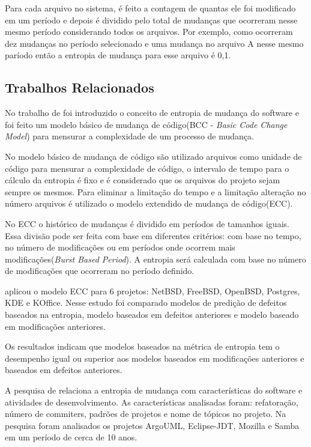 Para cada arquivo no sistema, é feito a contagem de quantas ele foi modificado em um período e depois é dividido pelo total de mudanças que ocorreram nesse mesmo período considerando todos os arquivos. Por exemplo, como ocorreram dez mudanças no período selecionado e uma mudança no arquivo A nesse mesmo paríodo então a entropia de mudança para esse arquivo é 0,1.

\subsection{Trabalhos Relacionados}
No trabalho de  foi introduzido o conceito de entropia de mudança do software e foi feito um modelo básico de mudança de código(BCC - \textit{Basic Code Change Model}) para mensurar a complexidade de um processo de mudança.

No modelo básico de mudança de código são utilizado arquivos como unidade de código para mensurar a complexidade de código, o intervalo de tempo para o cálculo da entropia é fixo e é considerado que os arquivos do projeto sejam sempre os mesmos. Para eliminar a limitação do tempo e a limitação alteração no número arquivos é utilizado o modelo extendido de mudança de código(ECC).

No ECC o histórico de mudanças é dividido em períodos de tamanhos iguais. Essa divisão pode ser feita com base em diferentes critérios: com base no tempo, no número de modificações ou em períodos onde ocorrem mais modificações(\textit{Burst Based Period}). A entropia será calculada com base no número de modificações que ocorreram no período definido.

 aplicou o modelo ECC para 6 projetos: NetBSD, FreeBSD, OpenBSD, Postgres, KDE e KOffice. Nesse estudo foi comparado modelos de predição de defeitos baseados na entropia, modelo baseados em defeitos anteriores e modelo baseado em modificações anteriores.

Os resultados indicam que modelos baseados na métrica de entropia tem o desempenho igual ou superior aos modelos baseados em modificações anteriores e baseados em defeitos anteriores.

A pesquisa de  relaciona a entropia de mudança com características do software e atividades de desenvolvimento. As características analisadas foram: refatoração, número de commiters, padrões de projetos e nome de tópicos no projeto. Na pesquisa foram analisados os projetos ArgoUML, Eclipse-JDT, Mozilla e Samba em um período de cerca de 10 anos.

